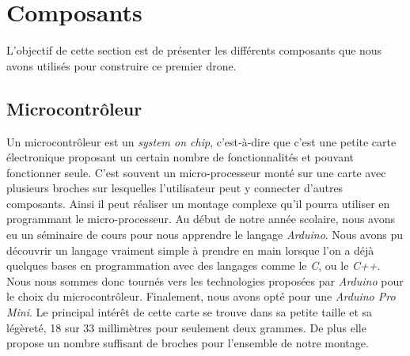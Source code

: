 \documentclass[a4paper,10pt]{report}
\begin{document}
    \section{Composants}
      L'objectif de cette section est de présenter les différents composants 
que nous avons utilisés pour construire ce premier drone.
      
      \subsection{Microcontrôleur}
	Un microcontrôleur est un \textit{system on chip}, c'est-à-dire que 
c'est une petite carte électronique proposant un certain nombre de 
fonctionnalités et pouvant fonctionner seule. C'est souvent un micro-processeur 
monté sur une carte avec plusieurs broches sur lesquelles l'utilisateur peut y 
connecter d'autres composants. Ainsi il peut réaliser un montage complexe qu'il 
pourra utiliser en programmant le micro-processeur.
	Au début de notre année scolaire, nous avons eu un séminaire de cours 
pour nous apprendre le langage \textit{Arduino}. Nous avons pu découvrir un 
langage vraiment simple à prendre en main lorsque l'on a déjà quelques bases en 
programmation avec des langages comme le \textit{C}, ou le \textit{C++}. Nous 
nous sommes donc tournés vers les technologies proposées par \textit{Arduino} 
pour le choix du microcontrôleur. Finalement, nous avons opté pour une 
\textit{Arduino Pro Mini}. Le principal intérêt de cette carte se trouve dans 
sa petite taille et sa légèreté, 18 sur 33 millimètres pour seulement deux 
grammes. De plus elle propose un nombre suffisant de broches pour l'ensemble de 
notre montage.
	
\end{document}
